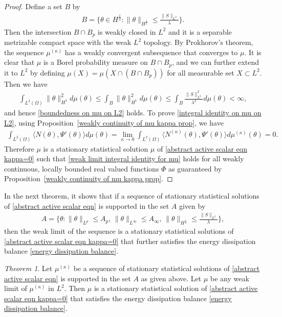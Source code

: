 \documentclass[reqno]{amsart}%
\theoremstyle{definition}
\theoremstyle{remark}
\numberwithin{equation}{section}
\newtheorem{theorem}{Theorem}
\newcommand{\1}{\mathbf{1}}
\numberwithin{equation}{section}
\numberwithin{theorem}{section}
\numberwithin{figure}{section}
\begin{document}
\begin{proof}
Define a set $B$ by
\begin{align*}
B=\Big\{\theta\in H^\frac{1}{2}:\|\theta\|_{H^\frac{1}{2}}\le\frac{\|S\|_{L^2}}{\lambda}\Big\}.
\end{align*}
Then the intersection $B\cap B_p$ is weakly closed in $L^2$ and it is a separable metrizable compact space with the weak $L^2$ topology. By Prokhorov's theorem, the sequence $\mu^{(\kappa)}$ has a weakly convergent subsequence that converges to $\mu$. It is clear that $\mu$ is a Borel probability measure on $B\cap B_p$, and we can further extend it to $L^2$ by defining $\mu(X)=\mu(X\cap(B\cap B_p))$ for all measurable set $X\subset L^2$. Then we have
\begin{align*}
\int_{L^2(\Omega)}\|\theta\|_{H^1}^2d\mu(\theta)\le \int_{B}\|\theta\|_{H^1}^2d\mu(\theta)\le \int_{B}\frac{\|S\|_{L^2}^2}{\lambda^2}d\mu(\theta)<\infty,
\end{align*}
and hence \eqref{boundedness on mu on L2} holds. To prove \eqref{integral identity on mu on L2}, using Proposition~\ref{weakly continuity of mu kappa prop}, we have
\begin{align*}
\int_{L^2(\Omega)}\langle N(\theta),\Psi'(\theta)\rangle d\mu(\theta)=\lim_{\kappa\to0}\int_{L^2(\Omega)}\langle N^{(\kappa)}(\theta),\Psi'(\theta)\rangle d\mu^{(\kappa)}(\theta)=0.
\end{align*}
Therefore $\mu$ is a stationary statistical solution $\mu$ of \eqref{abstract active scalar eqn kappa=0} such that \eqref{weak limit integral identity for mu} holds for all weakly continuous, locally bounded real valued functions $\Phi$ as guaranteed by Proposition~\ref{weakly continuity of mu kappa prop}.
\end{proof}

In the next theorem, it shows that if a sequence of stationary statistical solutions of \eqref{abstract active scalar eqn} is supported in the set $A$ given by
\begin{align*}
A=\Big\{\theta:\|\theta\|_{L^p}\le A_p,\,\|\theta\|_{L^\infty}\le A_{\infty},\,\|\theta\|_{H^\frac{1}{2}}\le\frac{\|S\|_{L^2}}{\lambda}\Big\},
\end{align*}
then the weak limit of the sequence is a stationary statistical solutions of \eqref{abstract active scalar eqn kappa=0} that further satisfies the energy dissipation balance \eqref{energy dissipation balance}.

\begin{theorem}
Let $\mu^{(\kappa)}$ be a sequence of stationary statistical solutions of \eqref{abstract active scalar eqn} is supported in the set $A$ as given above. Let $\mu$ be any weak limit of $\mu^{(\kappa)}$ in $L^2$. Then $\mu$ is a stationary statistical solution of \eqref{abstract active scalar eqn kappa=0} that satisfies the energy dissipation balance \eqref{energy dissipation balance}.
\end{theorem}
\end{document}
